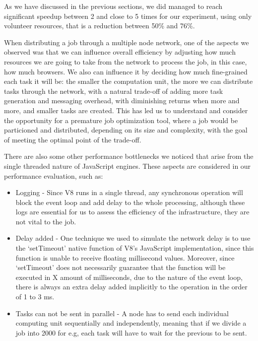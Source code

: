 As we have discussed in the previous sections, we did managed to reach significant speedup between 2 and close to 5 times for our experiment, using only volunteer resources, that is a reduction between 50\% and 76\%.

When distributing a job through a multiple node network, one of the aspects we observed was that we can influence overall efficiency by adjusting how much resources we are going to take from the network to process the job, in this case, how much browsers. We also can influence it by deciding how much fine-grained each task it will be: the smaller the computation unit, the more we can distribute tasks through the network, with a natural trade-off of adding more task generation and messaging overhead, with diminishing returns when more and more, and smaller tasks are created. This has led us to understand and consider the opportunity for a premature job optimization tool, where a job would be particioned and distributed, depending on its size and complexity, with the goal of meeting the optimal point of the trade-off.

There are also some other performance bottlenecks we noticed that arise from the single threaded nature of JavaScript engines. These aspects are considered in our performance evaluation, such as:

\begin{itemize}
  \item Logging - Since V8 runs in a single thread, any synchronous operation will block the event loop and add delay to the whole processing, although these logs are essential for us to assess the efficiency of the infrastructure, they are not vital to the job.
  \item Delay added - One technique we used to simulate the network delay is to use the `setTimeout' native function of V8's JavaScript implementation, since this function is unable to receive floating millisecond values. Moreover, since `setTimeout' does not necessarily guarantee that the function will be executed in X amount of milliseconds, due to the nature of the event loop, there is always an extra delay added implicitly to the operation in the order of 1 to 3 ms.
  \item Tasks can not be sent in parallel - A node has to send each individual computing unit sequentially and independently, meaning that if we divide a job into 2000 for e.g, each task will have to wait for the previous to be sent.
\end{itemize}

